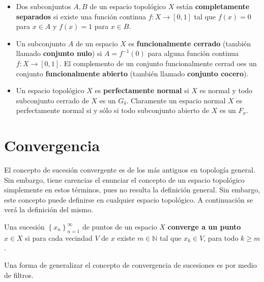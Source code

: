 \documentclass[12pt]{report}
\theoremstyle{largebreak}
\newcommand{\cf}[3]{\ensuremath{#1:#2\rightarrow#3}}
\begin{document}
    \begin{mydef}
        \begin{itemize}
            \item Dos subconjuntos $A,B$ de un espacio topológico $X$ están \textbf{completamente separados} si existe una función continua $\cf{f}{X}{[0,1]}$ tal que $f(x)=0$ para $x\in A$ y $f(x)=1$ para $x\in B$.
            \item Un subconjunto $A$ de un espacio $X$ es \textbf{funcionalmente cerrado} (también llamado \textbf{conjunto nulo}) si $A=f^{-1}(0)$ para alguna función continua $\cf{f}{X}{[0,1]}$. El complemento de un conjunto funcionalmente cerrad oes un conjunto \textbf{funcionalmente abierto} (también llamado \textbf{conjunto cocero}).
            \item Un espacio topológico $X$ es \textbf{perfectamente normal} si $X$ es normal y todo subconjunto cerrado de $X$ es un $G_\delta$. Claramente un espacio normal $X$ es perfectamente normal si y sólo si todo subconjunto abierto de $X$ es un $F_\sigma$.
        \end{itemize}
    \end{mydef}

    \section{Convergencia}

    El concepto de sucesión convergente es de los más antiguos en topología general. Sin embargo, tiene carencias el enunciar el concepto de un espacio topológico simplemente en estos términos, pues no resulta la definición general. Sin embargo, este concepto puede definirse en cualquier espacio topológico. A continuación se verá la definición del mismo.

    \begin{mydef}
        Una sucesión $\left\{x_n\right\}_{n=1}^{\infty}$ de puntos de un espacio $X$ \textbf{converge a un punto $x\in X$} si para cada vecindad $V$ de $x$ existe $m\in\mathbb{N}$ tal que $x_k\in V$, para todo $k\geq m$.
    \end{mydef}

    Una forma de generalizar el concepto de convergencia de sucesiones es por medio de filtros.
\end{document}
